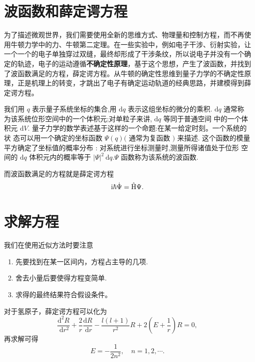 \documentclass[12pt]{article}
\begin{document}
\section{波函数和薛定谔方程}

为了描述微观世界，我们需要使用全新的思维方式、物理量和控制方程，而不再使用牛顿力学中的力、牛顿第二定理。在一些实验中，例如电子干涉、衍射实验，让一个一个的电子单独穿过双缝，最终却形成了干涉条纹，所以说电子并没有一个确定的轨迹，电子的运动遵循\textbf{不确定性原理}，基于这个思想，产生了波函数，并找到了波函数满足的方程，薛定谔方程。从牛顿的确定性思维到量子力学的不确定性原理，正是机理上的转变，才跳出了电子有确定运动轨道的经典思路，并建模得到薛定谔方程。

我们用 $q$ 表示量子系统坐标的集合,用 $\mathrm{d} q$ 表示这组坐标的微分的乘积. $\mathrm{d} q$ 通常称为该系统位形空间中的一个体积元;对单粒子来讲, $\mathrm{d} q$ 等同于普通空间 中的一个体积元 $\mathrm{d} V .$
量子力学的数学表述基于这样的一个命题:在某一给定时刻。一个系统的状 态可以用一个确定的坐标函数 $\Psi(q)($ 通常为复函数 $)$ 来描述. 这个函数的模量 平方确定了坐标值的概率分布 : 对系统进行坐标测量时,测量所得诸值处于位形 空间的 $\mathrm{d} q$ 体积元内的概率等于 $|\Psi|^{2} \mathrm{~d} q . \Psi$ 函数称为该系统的波函数.

而波函数满足的方程就是薛定谔方程
\begin{equation}
	\mathrm{i} \hbar \dot{\Psi} = \mathrm{\hat{H}}\Psi.
\end{equation}

\section{求解方程}

我们在使用近似方法时要注意
\begin{enumerate}
	\item 先要找到在某一区间内，方程占主导的几项.
	\item 舍去小量后要使得方程变简单.
	\item 求得的最终结果符合假设条件。
\end{enumerate}

对于氢原子，薛定谔方程可以化为
\begin{equation}
	\frac{\mathrm{d}^{2} R}{\mathrm{~d} r^{2}}+\frac{2}{r} \frac{\mathrm{d} R}{\mathrm{~d} r}-\frac{l(l+1)}{r^{2}} R+2\left(E+\frac{1}{r}\right) R=0,
\end{equation}
再求解可得
\begin{equation}
	E=-\frac{1}{2 n^{2}}, \quad n=1,2, \cdots.
\end{equation}
\end{document}
